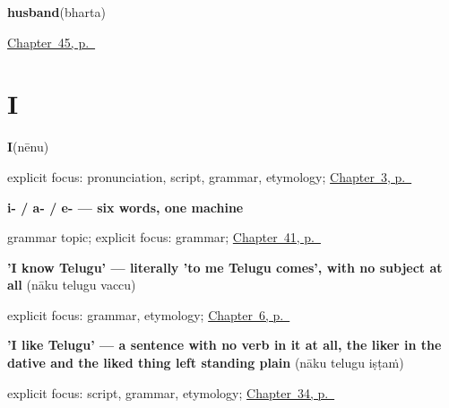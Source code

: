 \noindent\begin{minipage}[t]{\linewidth}
\raggedright
\textbf{husband}\enspace\emph{}\enspace(bharta)\par
\footnotesize \hyperref[ch:te-grandparents]{Chapter~45, p.~\pageref*{ch:te-grandparents}}
\end{minipage}\par\smallskip

\section*{I}

\noindent\begin{minipage}[t]{\linewidth}
\raggedright
\textbf{I}\enspace\emph{}\enspace(nēnu)\par
\footnotesize explicit focus: pronunciation, script, grammar, etymology; \hyperref[ch:responding]{Chapter~3, p.~\pageref*{ch:responding}}
\end{minipage}\par\smallskip

\noindent\begin{minipage}[t]{\linewidth}
\raggedright
\textbf{i- / a- / e- — six words, one machine}\par
\footnotesize grammar topic; explicit focus: grammar; \hyperref[ch:te-pointing-and-asking]{Chapter~41, p.~\pageref*{ch:te-pointing-and-asking}}
\end{minipage}\par\smallskip

\noindent\begin{minipage}[t]{\linewidth}
\raggedright
\textbf{'I know Telugu' — literally 'to me Telugu comes', with no subject at all}\enspace\emph{  }\enspace(nāku telugu vaccu)\par
\footnotesize explicit focus: grammar, etymology; \hyperref[ch:te-dative-case]{Chapter~6, p.~\pageref*{ch:te-dative-case}}
\end{minipage}\par\smallskip

\noindent\begin{minipage}[t]{\linewidth}
\raggedright
\textbf{'I like Telugu' — a sentence with no verb in it at all, the liker in the dative and the liked thing left standing plain}\enspace\emph{  }\enspace(nāku telugu iṣṭaṁ)\par
\footnotesize explicit focus: script, grammar, etymology; \hyperref[ch:te-verbs-between-people]{Chapter~34, p.~\pageref*{ch:te-verbs-between-people}}
\end{minipage}\par\smallskip


